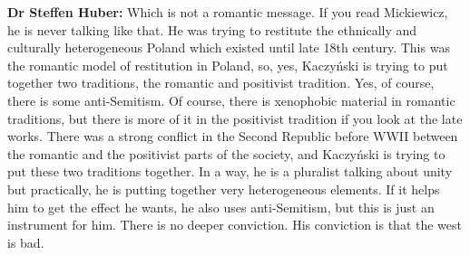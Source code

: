 \textbf{Dr Steffen Huber:} Which is not a romantic message. If you read Mickiewicz, he is never talking like that. He was trying to restitute the ethnically and culturally heterogeneous Poland which existed until late 18th century. This was the romantic model of restitution in Poland, so, yes, Kaczyński is trying to put together two traditions, the romantic and positivist tradition. Yes, of course, there is some anti-Semitism. Of course, there is xenophobic material in romantic traditions, but there is more of it in the positivist tradition if you look at the late works. There was a strong conflict in the Second Republic before WWII between the romantic and the positivist parts of the society, and Kaczyński is trying to put these two traditions together. In a way, he is a pluralist talking about unity but practically, he is putting together very heterogeneous elements. If it helps him to get the effect he wants, he also uses anti-Semitism, but this is just an instrument for him. There is no deeper conviction. His conviction is that the west is bad. 